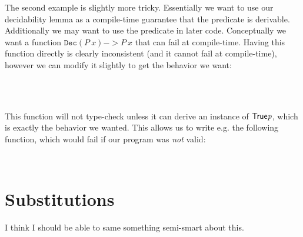 The second example is slightly more tricky. Essentially we want to use our
decidability lemma as a compile-time guarantee that the predicate is
derivable. Additionally we may want to use the predicate in later
code. Conceptually we want a function $\mathtt{Dec}(P\ x) -> P\ x$ that can fail at compile-time. Having this function directly is clearly inconsistent (and it cannot fail at compile-time), however we can modify it slightly to get the behavior we want:

\begin{code}
\> \AgdaSymbol{:}  \AgdaSymbol{\{}\AgdaSymbol{\}} \AgdaSymbol{\{} \AgdaSymbol{:}  \AgdaSymbol{\}} \<%
\\
\>[13]\<[14]%
\>[14]\AgdaSymbol{(} \AgdaSymbol{:}  \AgdaSymbol{)}  \AgdaSymbol{\{}\AgdaBound{\_} \AgdaSymbol{:}  \AgdaSymbol{\}} \<%
\\
\>[13]\<[14]%
\>[14]\<%
\end{code}

This function will not type-check unless it can derive an instance of
$\AgdaFunction{True} \AgdaBound{p}$, which is exactly the behavior we
wanted. This allows us to write e.g. the following function, which would fail if
our program was \emph{not} valid:

\begin{code}
\> \AgdaSymbol{:}   \<%
\\
\> \AgdaSymbol{=}  \AgdaSymbol{(} \AgdaSymbol{\_)}\<%
\end{code}

\section{Substitutions}
I think I should be able to same something semi-smart about this.

